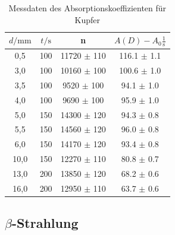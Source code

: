 \begin{table}
    \center
    \begin{tabular}{c c c c}
        \toprule
        $d / \unit{\milli\meter}$ &  $t / \unit\second$ &     n & $A(D) - A_0 \frac{1}{\unit\second}$\\
        \midrule
            0,5 &    100 & 11720 $\pm$ 110 & 116.1 $\pm$ 1.1 \\
            3,0 &    100 & 10160 $\pm$ 100 & 100.6 $\pm$ 1.0 \\
            3,5 &    100 &  9520 $\pm$ 100 &  94.1 $\pm$ 1.0 \\
            4,0 &    100 &  9690 $\pm$ 100 &  95.9 $\pm$ 1.0 \\
            5,0 &    150 & 14300 $\pm$ 120 &  94.3 $\pm$ 0.8 \\
            5,5 &    150 & 14560 $\pm$ 120 &  96.0 $\pm$ 0.8 \\
            6,0 &    150 & 14170 $\pm$ 120 &  93.4 $\pm$ 0.8 \\
           10,0 &    150 & 12270 $\pm$ 110 &  80.8 $\pm$ 0.7 \\
           13,0 &    200 & 13850 $\pm$ 120 &  68.2 $\pm$ 0.6 \\
           16,0 &    200 & 12950 $\pm$ 110 &  63.7 $\pm$ 0.6 \\
        \bottomrule
    \end{tabular}
    \caption{Messdaten des Absorptionskoeffizienten für Kupfer}
    \label{tab:md2kupfer}
\end{table}

\subsection[Beta-Strahlung]{$\beta$-Strahlung}

